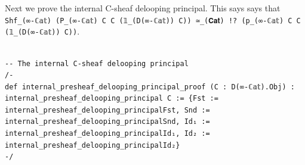 \documentclass{book}
\theoremstyle{definition}
\newcounter{lcounter}
\begin{document}
{\begin{center}
\begin{tcolorbox}[width=5in,colback={white},title={\begin{center}\texttt{Lean \thelcounter} \addtocounter{lcounter}{1}  \end{center}},colbacktitle=Yellow,coltitle=black]
\begin{verbatim}
\end{verbatim}
\end{tcolorbox}
\end{center}

Next we prove the internal C-sheaf delooping principal. This says says that \texttt{Shf\_(∞-ℂ𝕒𝕥) (P\_(∞-ℂ𝕒𝕥) C C (𝟙\_(D(∞-ℂ𝕒𝕥)) C)) ≃\_(𝐂𝐚𝐭) !? (p\_(∞-ℂ𝕒𝕥) C C (𝟙\_(D(∞-ℂ𝕒𝕥)) C))}.\\

\begin{center}
\begin{tcolorbox}[width=5in,colback={white},title={\begin{center}\texttt{Lean \thelcounter} \addtocounter{lcounter}{1}  \end{center}},colbacktitle=Yellow,coltitle=black]
\begin{verbatim}

-- The internal C-sheaf delooping principal
/-
def internal_presheaf_delooping_principal_proof (C : D(∞-ℂ𝕒𝕥).Obj) : internal_presheaf_delooping_principal C := {Fst := internal_presheaf_delooping_principalFst, Snd := internal_presheaf_delooping_principalSnd, Id₁ := internal_presheaf_delooping_principalId₁, Id₂ := internal_presheaf_delooping_principalId₂}
-/

\end{verbatim}
\end{tcolorbox}
\end{center}
\fi

\iffalse




}
\end{document}
